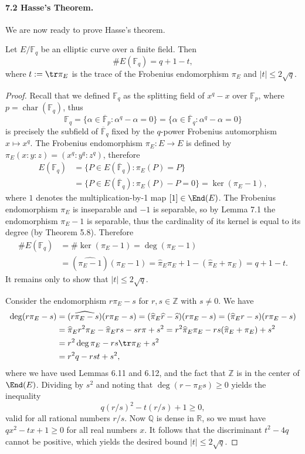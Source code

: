 \paragraph{7.2 Hasse's Theorem.}
We are now ready to prove Hasse's theorem.
\begin{theorem}[7.3; Hasse]
Let $E/\mathbb F_q$ be an elliptic curve over a finite field. Then
\[
\#E(\mathbb F_q)=q+1-t,
\]
where $t:=\tr\pi_E$ is the trace of the Frobenius endomorphism $\pi_E$ and $|t|\le2\sqrt q$.
\end{theorem}
\begin{proof}
Recall that we defined $\mathbb F_q$ as the splitting field of $x^q-x$ over $\mathbb F_p$, where $p=\operatorname{char}(\mathbb F_q)$, thus
\[
\mathbb F_q=\{\alpha\in\overline{\mathbb F}_p:\alpha^q-\alpha=0\}
=\{\alpha\in\overline{\mathbb F}_q:\alpha^q-\alpha=0\}
\]
is precisely the subfield of $\overline{\mathbb F}_q$ fixed by the $q$-power Frobenius automorphism $x\mapsto x^q$. The Frobenius endomorphism $\pi_E:E\to E$ is defined by $\pi_E(x:y:z)=(x^q:y^q:z^q)$, therefore
\[
\begin{aligned}
E(\mathbb F_q)&=\{P\in E(\overline{\mathbb F}_q):\pi_E(P)=P\}\\
&=\{P\in E(\overline{\mathbb F}_q):\pi_E(P)-P=0\}=\ker(\pi_E-1),
\end{aligned}
\]
where $1$ denotes the multiplication-by-1 map $[1]\in\End(E)$. The Frobenius endomorphism $\pi_E$ is inseparable and $-1$ is separable, so by Lemma 7.1 the endomorphism $\pi_E-1$ is separable, thus the cardinality of its kernel is equal to its degree (by Theorem 5.8). Therefore
\[
\begin{aligned}
\#E(\mathbb F_q)&=\#\ker(\pi_E-1)=\deg(\pi_E-1)\\
&=(\widehat{\pi_E-1})(\pi_E-1)
=\widehat\pi_E\pi_E+1-(\widehat\pi_E+\pi_E)=q+1-t.
\end{aligned}
\]
It remains only to show that $|t|\le2\sqrt q$.

Consider the endomorphism $r\pi_E-s$ for $r,s\in\mathbb Z$ with $s\ne0$. We have
\[
\begin{aligned}
\deg(r\pi_E-s)&=(\widehat{r\pi_E-s})(r\pi_E-s)
=(\widehat\pi_E\widehat r-\widehat s)(r\pi_E-s)
=(\widehat\pi_Er-s)(r\pi_E-s)\\
&=\widehat\pi_Er^2\pi_E-\widehat\pi_Ers-sr\pi+s^2
=r^2\widehat\pi_E\pi_E-rs(\widehat\pi_E+\pi_E)+s^2\\
&=r^2\deg\pi_E-rs\tr\pi_E+s^2\\
&=r^2q-rst+s^2,
\end{aligned}
\]
where we have used Lemmas 6.11 and 6.12, and the fact that $\mathbb Z$ is in the center of $\End(E)$. Dividing by $s^2$ and noting that $\deg(r-\pi_Es)\ge0$ yields the inequality
\[
q(r/s)^2-t(r/s)+1\ge0,
\]
valid for all rational numbers $r/s$. Now $\mathbb Q$ is dense in $\mathbb R$, so we must have $qx^2-tx+1\ge0$ for all real numbers $x$. It follows that the discriminant $t^2-4q$ cannot be positive, which yields the desired bound $|t|\le2\sqrt q$.
\end{proof}
